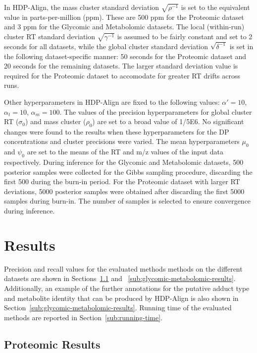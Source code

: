 In HDP-Align, the mass cluster standard deviation $\sqrt{\rho^{-1}}$ is set to the equivalent value in parts-per-million (ppm). These are 500 ppm for the Proteomic dataset and 3 ppm for the Glycomic and Metabolomic datasets. The local (within-run) cluster \ac{RT} standard deviation $\sqrt{\gamma^{-1}}$ is assumed to be fairly constant and set to 2 seconds for all datasets, while the global cluster standard deviation $\sqrt{\delta^{-1}}$ is set in the following dataset-specific manner: 50 seconds for the Proteomic dataset and 20 seconds for the remaining datasets. The larger standard deviation value is required for the Proteomic dataset to accomodate for greater \ac{RT} drifts across runs. 

Other hyperparameters in HDP-Align are fixed to the following values: $\alpha'=10$, $\alpha_t=10$, $\alpha_m=100$. The values of the precision hyperparameters for global cluster RT ($\sigma_0$) and mass cluster ($\rho_0$) are set to a broad value of 1/5E6. No significant changes were found to the results when these hyperparameters for the DP concentrations and cluster precisions were varied. The mean hyperparameters $\mu_0$ and $\psi_0$ are set to the means of the RT and m/z values of the input data respectively. During inference for the Glycomic and Metabolomic datasets, 500 posterior samples were collected for the Gibbs sampling procedure, discarding the first 500 during the burn-in period. For the Proteomic dataset with larger RT deviations, 5000 posterior samples were obtained after discarding the first 5000 samples during burn-in. The number of samples is selected to ensure convergence during inference.

\section{Results}

Precision and recall values for the evaluated methods methods on the different datasets are shown in Sections~\ref{sub:proteomic-results} and ~\ref{sub:glycomic-metabolomic-results}. Additionally, an example of the further annotations for the putative adduct type and metabolite identity that can be produced by HDP-Align is also shown in Section~\ref{sub:glycomic-metabolomic-results}. Running time of the evaluated methods are reported in Section~\ref{sub:running-time}.

\subsection{Proteomic Results}
\label{sub:proteomic-results}

